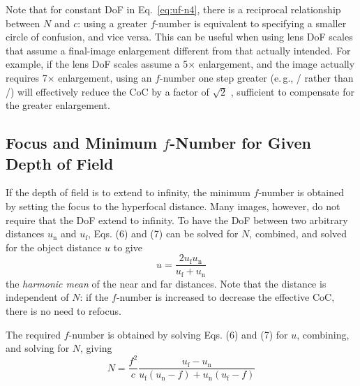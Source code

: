 \documentclass[11pt, oneside]{scrartcl}   	%
\newcommand{\f}[1]{\mbox{\raisebox{2pt}{\footnotesize $f$\hspace{-1.2pt}}/\hspace{-0.6pt}\raisebox{-0.6pt}{\small #1}}}
\begin{document}
Note that for constant DoF in Eq.~\ref{eq:uf-n4}, there is a reciprocal relationship between $N$ and
$c$: using a greater $f$-number is equivalent to specifying a smaller circle of confusion, and vice versa. This can be useful when using lens DoF scales that assume a final-image enlargement different from that actually intended. For example, if the lens DoF scales assume a 5× enlargement, and the image actually requires 7× enlargement, using an $f$-number one step greater (e.\,g., \f 8 rather than \f{5.6}) will effectively reduce the CoC by a factor of $\sqrt 2$ , sufficient to compensate for the greater enlargement.
\subsection{Focus and Minimum $f$-Number for Given Depth of Field}

If the depth of field is to extend to infinity, the minimum $f$-number
is obtained by setting the focus to the hyperfocal distance. Many
images, however, do not require that the DoF extend to infinity. To
have the DoF between two arbitrary distances $u_\mathrm{n}$ and $u_\mathrm{f}$, Eqs. (6)
and (7) can be solved for $N$, combined, and solved for the object
distance $u$ to give
\begin{equation}
  \label{eq:u}
  u = \frac{2u_\mathrm{f}u_\mathrm{n}}{u_\mathrm{f}+u_\mathrm{n}}
\end{equation}
the \emph{harmonic mean} of the near and far distances. Note that the distance is independent of $N$: if the $f$-number is increased to decrease the effective CoC, there is no need to refocus.

The required $f$-number is obtained by solving Eqs. (6) and (7) for
$u$, combining, and solving for $N$, giving
\begin{equation}
  \label{eq:N}
  N = \frac{f^2}c\frac{u_\mathrm{f} - u_\mathrm{n}}{u_\mathrm{f}(u_\mathrm{n}-f)+u_\mathrm{n}(u_\mathrm{f}-f)}
\end{equation}
\end{document}
